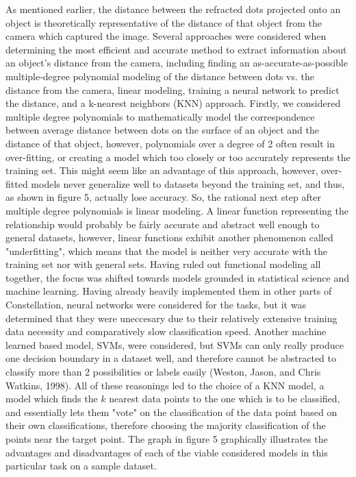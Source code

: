 As mentioned earlier, the distance between the refracted dots projected onto an object is theoretically representative of the distance of that object from the camera which captured the image. Several approaches were considered when determining the most efficient and accurate method to extract information about an object's distance from the camera, including finding an as-accurate-as-possible multiple-degree polynomial modeling of the distance between dots vs. the distance from the camera, linear modeling, training a neural network to predict the distance, and a k-nearest neighbors (KNN) approach. Firstly, we considered multiple degree polynomials to mathematically model the correspondence between average distance between dots on the surface of an object and the distance of that object, however, polynomials over a degree of 2  often result in over-fitting, or creating a model which too closely or too accurately represents the training set. This might seem like an advantage of this approach, however, over-fitted models never generalize well to datasets beyond the training set, and thus, as shown in figure 5, actually lose accuracy. So, the rational next step after multiple degree polynomials is linear modeling. A linear function representing the relationship would probably be fairly accurate and abstract well enough to general datasets, however, linear functions exhibit another phenomenon called "underfitting", which means that the model is neither very accurate with the training set nor with general sets. Having ruled out functional modeling all together, the focus was shifted towards models grounded in statistical science and machine learning. Having already heavily implemented them in other parts of Constellation, neural networks were considered for the tasks, but it was determined that they were uneccesary due to their relatively extensive training data necessity and comparatively slow classification speed. Another machine learned based model, SVMs, were considered, but SVMs can only really produce one decision boundary in a dataset well, and therefore cannot be abstracted to classify more than 2 possibilities or labels easily (Weston, Jason, and Chris Watkins, 1998). All of these reasonings led to the choice of a KNN model, a model which finds the $k$ nearest data points to the one which is to be classified, and essentially lets them "vote" on the classification of the data point based on their own classifications, therefore choosing the majority classification of the points near the target point. The graph in figure 5 graphically illustrates the advantages and disadvantages of each of the viable considered models in this particular task on a sample dataset.

